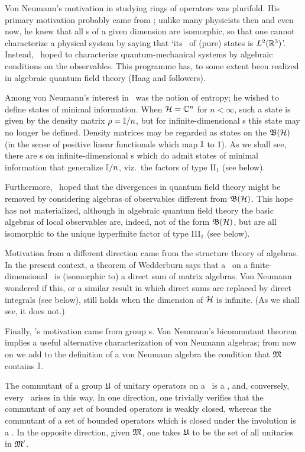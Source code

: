 Von Neumann's motivation in studying rings of operators was
plurifold. His primary motivation probably came from \qm; unlike many
physicists then and even now, he knew that all \Hs s of a given
dimension are isomorphic, so that one cannot characterize a physical
system by saying that `its \Hs\ of (pure) states is
$L^2({\Bbb R}^3)$'. Instead, \vN\ hoped to characterize quantum-mechanical
systems by algebraic conditions on the observables.  This programme
has, to some extent been realized in algebraic quantum field theory
(Haag and followers).

Among von Neumann's interest in \qm\ was the notion of entropy; he
wished to define states of minimal information. When ${\cal H}={\Bbb C}^n$ for
$n<\infty$, such a state is given by the density matrix $\rho={\Bbb I}/n$,
but for infinite-dimensional \Hs s this state may no longer be
defined.  Density matrices may be regarded as states on the \vNa ${\frak B}({\cal H})$
(in the sense of positive linear functionals which map ${\Bbb I}$ to 1).  As
we shall see, there are \vNa s on infinite-dimensional \Hs s which do
admit states of minimal information that generalize ${\Bbb I}/n$, viz.\ the
factors of type II$\mbox{}_1$ (see below).

Furthermore, \vN\ hoped that the divergences in quantum field theory
might be removed by considering algebras of observables different from
${\frak B}({\cal H})$.  This hope has not materialized, although in algebraic quantum
field theory the basic algebras of local observables are, indeed, not
of the form ${\frak B}({\cal H})$, but are all isomorphic to the unique hyperfinite
factor of type III$\mbox{}_1$ (see below).

Motivation from a different direction came from the structure theory
of algebras. In the present context, a theorem of Wedderburn says that
a \vNa\ on a finite-dimensional \Hs\ is (isomorphic to) a direct sum
of matrix algebras. Von Neumann wondered if this, or a similar result
in which direct sums are replaced by direct integrals (see below),
still holds when the dimension of ${\cal H}$ is infinite.  (As we shall see,
it does not.)

Finally, \vN's motivation came from group \rep s.  Von Neumann's
bicommutant theorem implies a useful alternative characterization of
von Neumann algebras; from now on we add to the definition of a von
Neumann algebra the condition that ${\frak M}$ contains ${\Bbb I}$.

The commutant of a group ${\frak U}$ of unitary operators on a \Hs\ is a
\vNa, and, conversely, every \vNa\ arises in this way.  In one
direction, one trivially verifies that the commutant of any set of
bounded operators is weakly closed, whereas the commutant of a set of
bounded operators which is closed under the involution is a \sta. In
the opposite direction, given ${\frak M}$, one takes ${\frak U}$ to be the set of
all unitaries in ${\frak M}'$.

